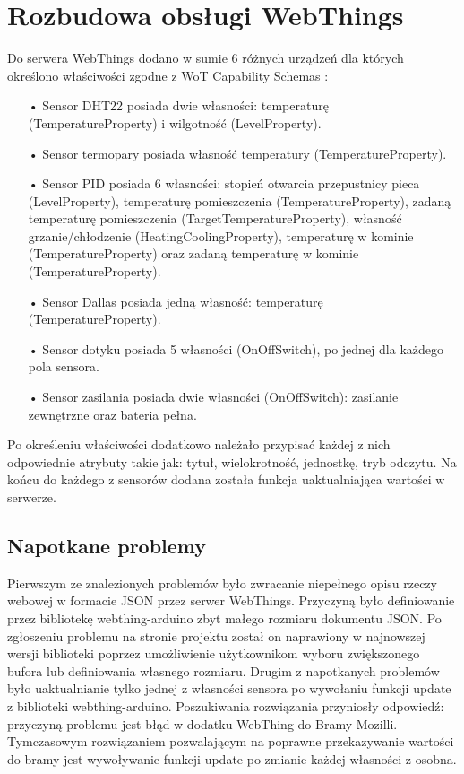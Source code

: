 \documentclass[11pt]{report}
\begin{document}
 \section{Rozbudowa obsługi WebThings}
 Do serwera WebThings dodano w sumie 6 różnych urządzeń dla których określono właściwości zgodne z  WoT Capability Schemas \cite{wotschemas2020}:
 \begin{enumerate}
 \item[•] Sensor DHT22 posiada dwie własności: temperaturę (TemperatureProperty) i wilgotność (LevelProperty).
 \item[•] Sensor termopary posiada własność temperatury (TemperatureProperty).
 \item[•] Sensor PID posiada 6 własności: stopień otwarcia przepustnicy pieca (LevelProperty), temperaturę pomieszczenia (TemperatureProperty), zadaną temperaturę pomieszczenia (TargetTemperatureProperty), własność grzanie/chłodzenie (HeatingCoolingProperty), temperaturę w kominie (TemperatureProperty) oraz zadaną temperaturę w kominie (TemperatureProperty).
 \item[•] Sensor Dallas posiada jedną własność: temperaturę (TemperatureProperty).
 \item[•] Sensor dotyku posiada 5 własności (OnOffSwitch), po jednej dla każdego pola sensora.
 \item[•] Sensor zasilania posiada dwie własności (OnOffSwitch): zasilanie zewnętrzne oraz bateria pełna.
 \end{enumerate}
 Po określeniu właściwości dodatkowo należało przypisać każdej z nich odpowiednie atrybuty takie jak: tytuł, wielokrotność, jednostkę, tryb odczytu.
 Na końcu do każdego z sensorów dodana została funkcja uaktualniająca wartości w serwerze.
 \subsection{Napotkane problemy}
 Pierwszym ze znalezionych problemów było zwracanie niepełnego opisu rzeczy webowej w formacie JSON przez serwer WebThings. Przyczyną było definiowanie przez bibliotekę webthing-arduino zbyt małego rozmiaru dokumentu JSON. Po zgłoszeniu problemu na stronie projektu został on naprawiony w najnowszej wersji biblioteki poprzez umożliwienie użytkownikom wyboru zwiększonego bufora lub definiowania własnego rozmiaru.
 Drugim z napotkanych problemów było uaktualnianie tylko jednej z własności sensora po wywołaniu funkcji update z biblioteki webthing-arduino. Poszukiwania rozwiązania przyniosły odpowiedź: przyczyną problemu jest błąd w dodatku WebThing do Bramy Mozilli. Tymczasowym rozwiązaniem pozwalającym na poprawne przekazywanie wartości do bramy jest wywoływanie funkcji update po zmianie każdej własności z osobna.
\end{document}
